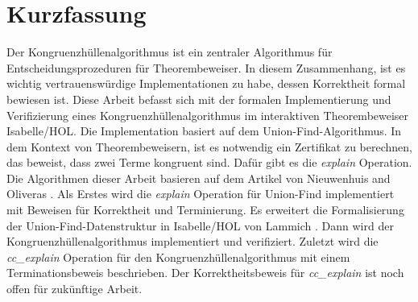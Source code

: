 \chapter{Kurzfassung}

Der Kongruenzhüllenalgorithmus ist ein zentraler Algorithmus für Entscheidungsprozeduren für Theorembeweiser. In diesem Zusammenhang, ist es wichtig vertrauenswürdige Implementationen zu habe, dessen Korrektheit formal bewiesen ist. Diese Arbeit befasst sich mit der formalen Implementierung und Verifizierung eines Kongruenzhüllenalgorithmus im interaktiven Theorembeweiser Isabelle/HOL. Die Implementation basiert auf dem Union-Find-Algorithmus. In dem Kontext von Theorembeweisern, ist es notwendig ein Zertifikat zu berechnen, das beweist, dass zwei Terme kongruent sind. Dafür gibt es die \emph{explain} Operation. Die Algorithmen dieser Arbeit basieren auf dem Artikel von Nieuwenhuis and Oliveras \cite{Nieuwenhuis}.
Als Erstes wird die \emph{explain} Operation für Union-Find implementiert mit Beweisen für Korrektheit und Terminierung. Es erweitert die Formalisierung der Union-Find-Datenstruktur in Isabelle/HOL von Lammich \cite{unionfind-isabelle}. Dann wird der Kongruenzhüllenalgorithmus implementiert und verifiziert. Zuletzt wird die \emph{cc\_explain} Operation für den Kongruenzhüllenalgorithmus mit einem Terminationsbeweis beschrieben. Der Korrektheitsbeweis für \emph{cc\_explain} ist noch offen für zukünftige Arbeit.